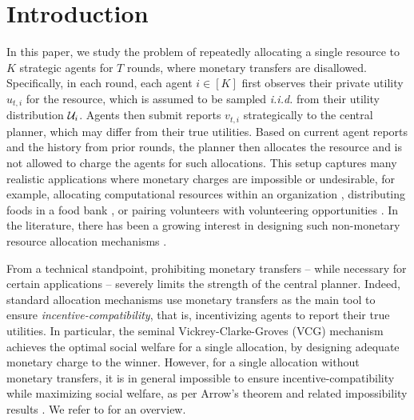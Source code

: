 

\section{Introduction}
In this paper, we study the problem of repeatedly allocating a single resource to $K$ strategic agents for $T$ rounds, where monetary transfers are disallowed. Specifically, in each round, each agent $i\in[K]$ first observes their private utility $u_{t,i}$ for the resource, which is assumed to be sampled \textit{i.i.d.} from their utility distribution $\mathcal{U}_i$. Agents then submit reports $v_{t,i}$ strategically to the central planner, which may differ from their true utilities. Based on current agent reports and the history from prior rounds, the planner then allocates the resource and is not allowed to charge the agents for such allocations. This setup captures many realistic applications where monetary charges are impossible or undesirable, for example, allocating computational resources within an organization \citep{ng2011online}, distributing foods in a food bank \citep{prendergast2017food,prendergast2022allocation}, or pairing volunteers with volunteering opportunities \citep{manshadi2023redesigning}. In the literature, there has been a growing interest in designing such non-monetary resource allocation mechanisms \citep{schummer2007mechanism}.

From a technical standpoint, prohibiting monetary transfers -- while necessary for certain applications -- severely limits the strength of the central planner. Indeed, standard allocation mechanisms use monetary transfers as the main tool to ensure \emph{incentive-compatibility}, that is, incentivizing agents to report their true utilities. In particular, the seminal Vickrey-Clarke-Groves (VCG) mechanism \citep{vickrey1961counterspeculation,clarke1971multipart,groves1973incentives} achieves the optimal social welfare for a single allocation, by designing adequate monetary charge to the winner. However, for a single allocation without monetary transfers, it is in general impossible to ensure incentive-compatibility while maximizing social welfare, as per Arrow's theorem and related impossibility results \citep{arrow1950difficulty,gi73,s75}. We refer to \citep{schummer2007mechanism} for an overview.


